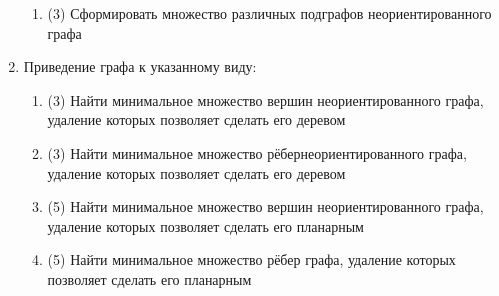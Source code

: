 \begin{enumerate}
\begin{enumerate}[1.]
  \item (3) Сформировать множество различных подграфов неориентированного графа 
  \end{enumerate}
\item Приведение графа к указанному виду:
  \begin{enumerate}[1.]
  \item (3) Найти минимальное множество вершин неориентированного графа, удаление которых позволяет сделать его деревом 
  \item (3) Найти минимальное множество рёбернеориентированного графа, удаление которых позволяет сделать его деревом 
  \item (5) Найти минимальное множество вершин неориентированного графа, удаление которых позволяет сделать его планарным 
  \item (5) Найти минимальное множество рёбер графа, удаление которых позволяет сделать его планарным 
  \end{enumerate}
\end{enumerate}

